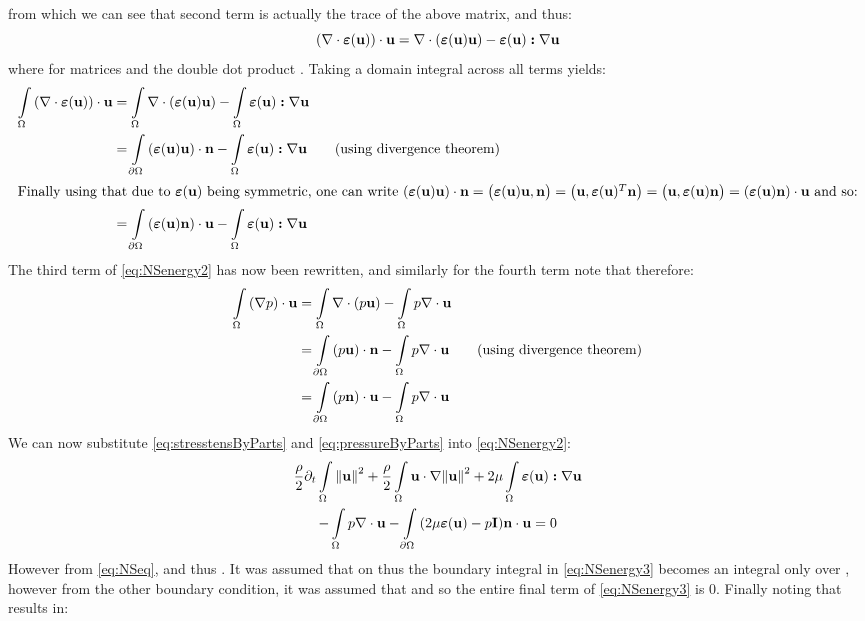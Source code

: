 from which we can see that second term is actually the trace of the above matrix, and thus:
\begin{equation*}
\qty(\nabla\cdot\bm{\varepsilon}({\textbf{u}}))\cdot{\textbf{u}} = \nabla\cdot\qty(\bm{\varepsilon}({\textbf{u}}){\textbf{u}}) - \bm{\varepsilon}({\textbf{u}})\bm{:}\nabla{\textbf{u}}
\end{equation*}
where for matrices  and  the double dot product . Taking a domain integral across all terms yields:
\begin{align}
    \int\limits_{\Omega}\qty(\nabla\cdot\bm{\varepsilon}({\textbf{u}}))\cdot{\textbf{u}} &= \int\limits_{\Omega}\nabla\cdot\qty(\bm{\varepsilon}({\textbf{u}}){\textbf{u}}) - \int\limits_{\Omega}\bm{\varepsilon}({\textbf{u}})\bm{:}\nabla{\textbf{u}} \notag\\
            &= \int\limits_{\partial\Omega}\qty(\bm{\varepsilon}({\textbf{u}}){\textbf{u}})\cdot{\textbf{n}} - \int\limits_{\Omega}\bm{\varepsilon}({\textbf{u}})\bm{:}\nabla{\textbf{u}} \tag*{(using divergence theorem)}\\
            \intertext{Finally using that due to \(\bm{\varepsilon}({\textbf{u}})\) being symmetric, one can write \(\qty(\bm{\varepsilon}({\textbf{u}}){\textbf{u}})\cdot{\textbf{n}}= \big(\bm{\varepsilon}({\textbf{u}}){\textbf{u}},{\textbf{n}}\big) = \big({\textbf{u}},\bm{\varepsilon}({\textbf{u}})^T{\textbf{n}}\big) = \big({\textbf{u}},\bm{\varepsilon}({\textbf{u}}){\textbf{n}}\big) = \qty(\bm{\varepsilon}({\textbf{u}}){\textbf{n}})\cdot{\textbf{u}}\) and so:}
            &= \int\limits_{\partial\Omega}\qty(\bm{\varepsilon}({\textbf{u}}){\textbf{n}})\cdot{\textbf{u}} - \int\limits_{\Omega}\bm{\varepsilon}({\textbf{u}})\bm{:}\nabla{\textbf{u}} \label{eq:stresstensByParts}
\end{align}
The third term of \eqref{eq:NSenergy2} has now been rewritten, and similarly for the fourth term note that  therefore:
\begin{align}
    \int\limits_{\Omega}\qty(\nabla p)\cdot{\textbf{u}} &= \int\limits_{\Omega}\nabla\cdot\qty(p{\textbf{u}}) - \int\limits_{\Omega}  p\nabla\cdot{\textbf{u}} \notag\\
                    &= \int\limits_{\partial\Omega}\qty(p{\textbf{u}})\cdot{\textbf{n}} - \int\limits_{\Omega}  p\nabla\cdot{\textbf{u}} \tag*{(using divergence theorem)}\\
                    &= \int\limits_{\partial\Omega}\qty(p{\textbf{n}})\cdot{\textbf{u}} - \int\limits_{\Omega}  p\nabla\cdot{\textbf{u}}\label{eq:pressureByParts}
\end{align}
 We can now substitute \eqref{eq:stresstensByParts} and \eqref{eq:pressureByParts} into \eqref{eq:NSenergy2}:
 \begin{multline}\label{eq:NSenergy3}
     \frac{\rho}{2}\partial_{t}\int\limits_{\Omega}\norm{{\textbf{u}}}^2 + \frac{\rho}{2}\int\limits_{\Omega}{\textbf{u}}\cdot\nabla\norm{{\textbf{u}}}^2 + 2\mu\int\limits_{\Omega}\bm{\varepsilon}({\textbf{u}}) \bm{:} \nabla{\textbf{u}}\\ - \int\limits_{\Omega} p\nabla\cdot{\textbf{u}} - \int\limits_{\partial\Omega}\qty(2\mu\bm{\varepsilon}({\textbf{u}}) - p\mathbf{I}){\textbf{n}} \cdot {\textbf{u}} = 0
 \end{multline}
 However  from \eqref{eq:NSeq}, and thus . It was assumed that  on  thus the boundary integral in \eqref{eq:NSenergy3} becomes an integral only over , however from the other boundary condition, it was assumed that  and so the entire final term of \eqref{eq:NSenergy3} is 0. Finally noting that \mathm{\bm{\varepsilon}(\bmu) \bm{:} \nabla\bmu = \bm{\varepsilon}(\bmu) \bm{:} \bm{\varepsilon}(\bmu)} results in:
 
